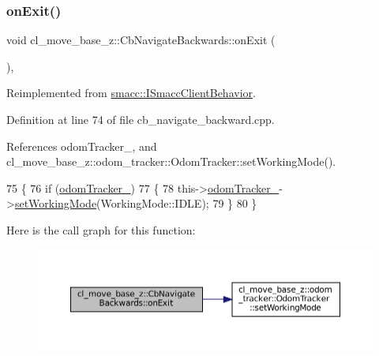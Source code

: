 \mbox{\label{classcl__move__base__z_1_1CbNavigateBackwards_a92858e20e6401051203f5dfa4aef60dc}} 
\subsubsection{\texorpdfstring{on\+Exit()}{onExit()}}
{\footnotesize\ttfamily void cl\+\_\+move\+\_\+base\+\_\+z\+::\+Cb\+Navigate\+Backwards\+::on\+Exit (\begin{DoxyParamCaption}{ }\end{DoxyParamCaption})\hspace{0.3cm}{\ttfamily [override]}, {\ttfamily [virtual]}}



Reimplemented from \hyperlink{classsmacc_1_1ISmaccClientBehavior_a36bf771905e3bf750909a15e4215a9b3}{smacc\+::\+I\+Smacc\+Client\+Behavior}.



Definition at line 74 of file cb\+\_\+navigate\+\_\+backward.\+cpp.



References odom\+Tracker\+\_\+, and cl\+\_\+move\+\_\+base\+\_\+z\+::odom\+\_\+tracker\+::\+Odom\+Tracker\+::set\+Working\+Mode().


\begin{DoxyCode}
75     \{
76         \textcolor{keywordflow}{if} (\hyperlink{classcl__move__base__z_1_1CbNavigateBackwards_a75a8ae7aef6c72e96f4037c4941b0341}{odomTracker\_})
77         \{
78             this->\hyperlink{classcl__move__base__z_1_1CbNavigateBackwards_a75a8ae7aef6c72e96f4037c4941b0341}{odomTracker\_}->\hyperlink{classcl__move__base__z_1_1odom__tracker_1_1OdomTracker_aeed01bdefd9a1cc709b0b3e4eed285ed}{setWorkingMode}(WorkingMode::IDLE);
79         \}
80     \}
\end{DoxyCode}
Here is the call graph for this function\+:
\nopagebreak
\begin{figure}[H]
\begin{center}
\leavevmode
\includegraphics[width=350pt]{classcl__move__base__z_1_1CbNavigateBackwards_a92858e20e6401051203f5dfa4aef60dc_cgraph}
\end{center}
\end{figure}


